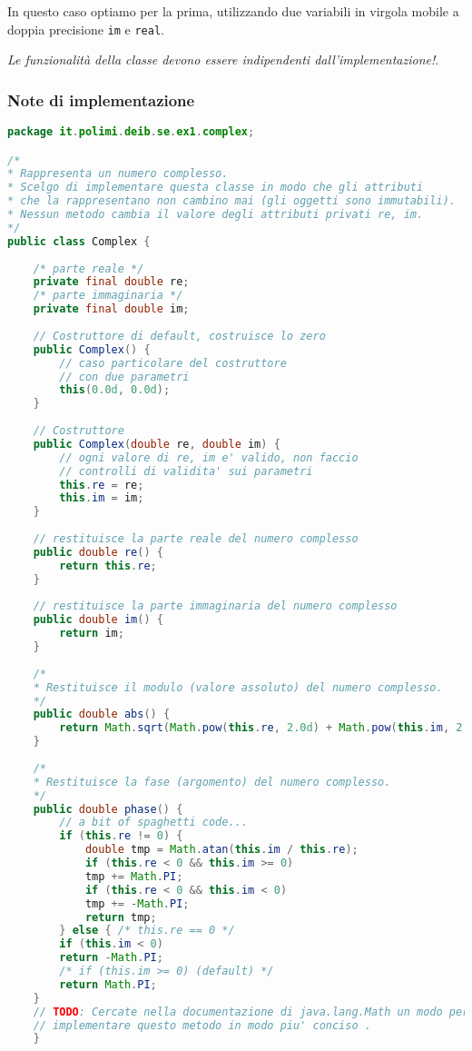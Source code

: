 \documentclass{article}
\begin{document}
In questo caso optiamo per la prima, utilizzando due variabili in virgola mobile a doppia precisione \texttt{im} e \texttt{real}.

\emph{Le funzionalità della classe devono essere indipendenti dall'implementazione!}.

\subsubsection{Note di implementazione}
\begin{lstlisting}[language=Java,escapechar=|]
package it.polimi.deib.se.ex1.complex;

/*
* Rappresenta un numero complesso.
* Scelgo di implementare questa classe in modo che gli attributi
* che la rappresentano non cambino mai (gli oggetti sono immutabili).
* Nessun metodo cambia il valore degli attributi privati re, im.
*/
public class Complex {
	
	/* parte reale */
	private final double re;
	/* parte immaginaria */
	private final double im;
	
	// Costruttore di default, costruisce lo zero
	public Complex() {
		// caso particolare del costruttore
		// con due parametri
		this(0.0d, 0.0d);
	}
	
	// Costruttore
	public Complex(double re, double im) {
		// ogni valore di re, im e' valido, non faccio
		// controlli di validita' sui parametri
		this.re = re;
		this.im = im;
	}
	
	// restituisce la parte reale del numero complesso
	public double re() {
		return this.re;
	}
	
	// restituisce la parte immaginaria del numero complesso
	public double im() {
		return im;
	}
	
	/*
	* Restituisce il modulo (valore assoluto) del numero complesso.
	*/
	public double abs() {
		return Math.sqrt(Math.pow(this.re, 2.0d) + Math.pow(this.im, 2.0d));
	}
	
	/*
	* Restituisce la fase (argomento) del numero complesso.
	*/
	public double phase() {
		// a bit of spaghetti code...
		if (this.re != 0) {
			double tmp = Math.atan(this.im / this.re);
			if (this.re < 0 && this.im >= 0)
			tmp += Math.PI;
			if (this.re < 0 && this.im < 0)
			tmp += -Math.PI;
			return tmp;
		} else { /* this.re == 0 */
		if (this.im < 0)
		return -Math.PI;
		/* if (this.im >= 0) (default) */
		return Math.PI;
	}
	// TODO: Cercate nella documentazione di java.lang.Math un modo per
	// implementare questo metodo in modo piu' conciso .
    }


\end{lstlisting}
\end{document}
